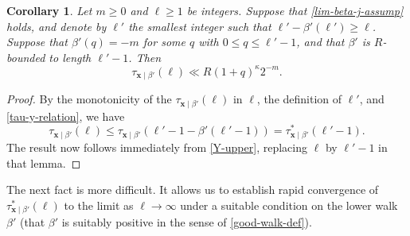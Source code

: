 \documentclass[11pt,reqno]{amsart}
\numberwithin{equation}{section}
\newtheorem{corollary}[theorem]{Corollary}
\theoremstyle{definition}
\theoremstyle{remark}
\newcommand{\mbf}{\mathbf}
\renewcommand{\le}{\leqslant}
\renewcommand{\ge}{\geqslant}
\begin{document}
\begin{corollary}\label{Y-upper-nonstar}
Let $m \ge 0$ and $\ell \ge 1$ be integers. Suppose that \cref{lim-beta-j-assump} holds, and denote by $\ell'$ the smallest integer such that $\ell' - \beta'(\ell') \ge \ell$. Suppose that $\beta'(q) = -m$ for some $q$ with $0 \le q \le \ell'-1$, and that $\beta'$ is $R$-bounded to length $\ell'-1$. Then 
\begin{equation*} \tau_{\mbf{x} \mid \beta'}(\ell) \ll R (1 + q)^{\kappa} 2^{-m}.\end{equation*}    
\end{corollary}
\begin{proof}
By the monotonicity of the $\tau_{\mbf{x} \mid \beta'}(\ell)$ in $\ell$, the definition of $\ell'$, and \cref{tau-y-relation}, we have 
\[ \tau_{\mbf{x} \mid \beta'}(\ell) \le \tau_{\mbf{x} \mid \beta'}(\ell' - 1 - \beta'(\ell' - 1)) = \tau^*_{\mbf{x} \mid \beta'}(\ell'-1).\] The result now follows immediately from \cref{Y-upper}, replacing $\ell$ by $\ell' - 1$ in that lemma.
\end{proof}


The next fact is more difficult. It allows us to establish rapid convergence of $\tau^*_{\mbf{x} \mid \beta'}(\ell)$ to the limit as $\ell \rightarrow \infty$ under a suitable condition on the lower walk $\beta'$ (that $\beta'$ is suitably positive in the sense of \cref{good-walk-def}).
\end{document}
